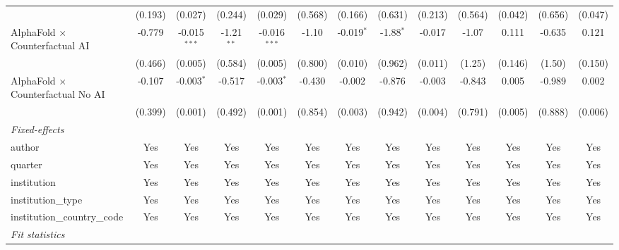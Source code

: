 \begin{tabular}{lcccccccccccc}
                                            & (0.193)      & (0.027)        & (0.244)      & (0.029)        & (0.568) & (0.166)      & (0.631)     & (0.213) & (0.564) & (0.042)       & (0.656) & (0.047)\\   
   AlphaFold $\times$ Counterfactual AI     & -0.779       & -0.015$^{***}$ & -1.21$^{**}$ & -0.016$^{***}$ & -1.10   & -0.019$^{*}$ & -1.88$^{*}$ & -0.017  & -1.07   & 0.111         & -0.635  & 0.121\\   
                                            & (0.466)      & (0.005)        & (0.584)      & (0.005)        & (0.800) & (0.010)      & (0.962)     & (0.011) & (1.25)  & (0.146)       & (1.50)  & (0.150)\\   
   AlphaFold $\times$ Counterfactual No AI  & -0.107       & -0.003$^{*}$   & -0.517       & -0.003$^{*}$   & -0.430  & -0.002       & -0.876      & -0.003  & -0.843  & 0.005         & -0.989  & 0.002\\   
                                            & (0.399)      & (0.001)        & (0.492)      & (0.001)        & (0.854) & (0.003)      & (0.942)     & (0.004) & (0.791) & (0.005)       & (0.888) & (0.006)\\   
   \midrule
   \emph{Fixed-effects}\\
   author                                   & Yes          & Yes            & Yes          & Yes            & Yes     & Yes          & Yes         & Yes     & Yes     & Yes           & Yes     & Yes\\  
   quarter                                  & Yes          & Yes            & Yes          & Yes            & Yes     & Yes          & Yes         & Yes     & Yes     & Yes           & Yes     & Yes\\  
   institution                              & Yes          & Yes            & Yes          & Yes            & Yes     & Yes          & Yes         & Yes     & Yes     & Yes           & Yes     & Yes\\  
   institution\_type                        & Yes          & Yes            & Yes          & Yes            & Yes     & Yes          & Yes         & Yes     & Yes     & Yes           & Yes     & Yes\\  
   institution\_country\_code               & Yes          & Yes            & Yes          & Yes            & Yes     & Yes          & Yes         & Yes     & Yes     & Yes           & Yes     & Yes\\  
   \midrule
   \emph{Fit statistics}\\

\end{tabular}
